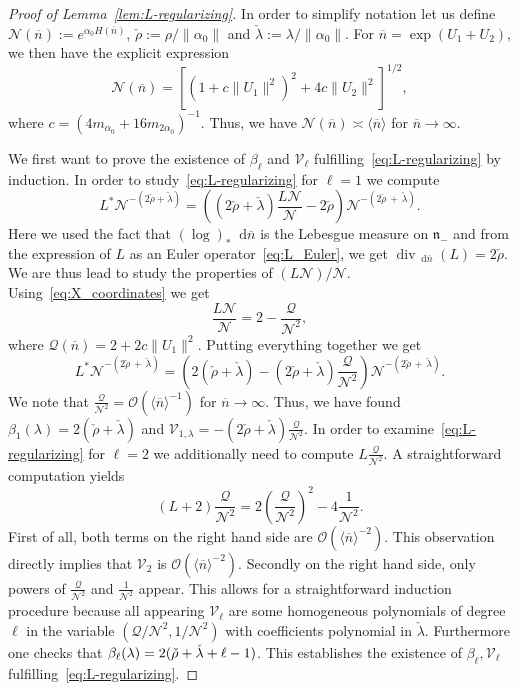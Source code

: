 \documentclass[AHL, Unicode, longabstracts, published]{cedram}
\DeclareMathOperator{\Div}{div}
\newcommand{\mc}{\mathcal}
\newcommand{\la}{\lambda}
\newcommand{\intd}{\mathop{}\!\mathrm{d}}
\newcommand{\n}{\mathfrak n}
\newcommand{\bn}{{\overline{n}}}
\begin{document}
\begin{proof}[Proof of Lemma~\ref{lem:L-regularizing}]
In order to simplify notation let us define $\mc{N}(\bn):= e^{\alpha_0 H(\bn)}$, $\check \rho:=\rho/\|\alpha_0\|$ and $\check\lambda:=\lambda/\|\alpha_0\|$. For $\bn=\exp(U_1+U_2)$, we then have the explicit expression~\cite[Theorem~IX.3.8]{Hel78}
\begin{equation}\label{eq:X_coordinates}
\mc{N}(\bn) = \left[\left(1+c\|U_1\|^2\right)^2 + 4c\|U_2\|^2\right]^{1/2},
\end{equation}
where $c=(4m_{\alpha_0} + 16m_{2\alpha_0})^{-1}$. Thus, we have $\mc{N}(\bn) \asymp \langle\bn\rangle$ for $\bn\to\infty$.

We first want to prove the existence of $\beta_\ell$ and $\mathcal V_\ell$ fulfilling~\eqref{eq:L-regularizing} by induction. In order to study~\eqref{eq:L-regularizing} for $\ell=1$ we compute
\[
L^*\mc{N}^{-(2\check\rho + \check\lambda)} = \left(\left(2\check \rho+\check \lambda\right)
\frac{L\mc{N}}{\mc{N}} - 2\check \rho\right)\mc{N}^{-(2\check\rho\,+\,\check \lambda)}.
\]
Here we used the fact that $(\log)_*\intd \bn$ is the Lebesgue measure on $\n_-$ and from the expression of $L$ as an Euler operator~\eqref{eq:L_Euler}, we get $\Div_{\intd\bn}(L) = 2\check\rho$. We are thus lead to study the properties of $(L\mc{N})/\mc{N}$. Using~\eqref{eq:X_coordinates} we get
\begin{equation}\label{LN/N}
\frac{L\mc{N}}{\mc{N}} = 2-\frac{\mc{Q}}{\mc{N}^2},
\end{equation}
where $\mc{Q}(\bn) = 2+2c\|U_1\|^2$. Putting everything together we get
\begin{equation}\label{eq:lstarN}
L^*\mc{N}^{-(2\check\rho\,+\,\check\lambda)} = \left(2\left(\check\rho + \check\lambda\right) - \left(2\check\rho + \check\lambda\right) \frac{\mc{Q}}{\mc{N}^2}
\right)\mc{N}^{-(2\check\rho\,+\,\check\lambda)}.
\end{equation}
We note that $\frac{\mc{Q}}{\mc{N}^ 2} = \mc{O}(\langle \bn\rangle^{-1})$ for $\bn\to\infty$. Thus, we have found $\beta_1(\lambda) = 2(\check\rho + \check\lambda)$ and $\mathcal V_{1,\lambda}=-(2\check \rho + \check\lambda)\frac{\mc{Q}}{\mc{N}^ 2}$. In order to examine~\eqref{eq:L-regularizing} for $\ell=2$ we additionally need to compute $L\frac{\mathcal Q}{\mathcal N^2}$. A straightforward computation yields
\[
(L+2)\frac{\mc{Q}}{\mc{N}^2} = 2\left(\frac{\mc{Q}}{\mc{N}^2}\right)^2 -4\frac{1}{\mc{N}^2}.
\]
First of all, both terms on the right hand side are $\mc{O}(\langle\bn\rangle^{-2})$. This observation directly implies that $\mathcal V_2$ is $\mathcal O(\langle\bn\rangle^{-2})$. Secondly on the right hand side, only powers of $\frac{\mc{Q}}{\mc{N}^2}$ and $\frac{1}{\mc{N}^2}$ appear. This allows for a straightforward induction procedure because all appearing $\mc V_\ell$ are some homogeneous polynomials of degree $\ell$ in the variable $(\mc{Q}/\mc{N}^2,1/\mc{N}^2)$ with coefficients polynomial in $\check\la$. Furthermore one checks that $\beta_{\ell}(\la)\linebreak=2(\check\rho + \check\lambda+\ell-1)$. This establishes the existence of $\beta_\ell, \mc V_\ell$ fulfilling~\eqref{eq:L-regularizing}.


\end{proof}
\end{document}
